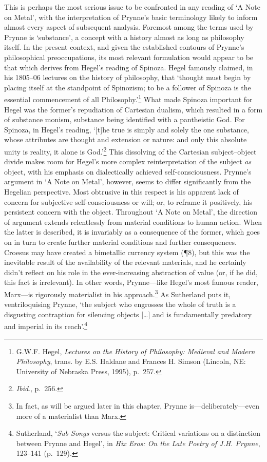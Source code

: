 \documentclass[]{article}
\begin{document}
This is perhaps the most serious issue to be confronted in any reading
of `A Note on Metal', with the interpretation of Prynne's basic
terminology likely to inform almost every aspect of subsequent analysis.
Foremost among the terms used by Prynne is `substance', a concept with a
history almost as long as philosophy itself. In the present context, and
given the established contours of Prynne's philosophical preoccupations,
its most relevant formulation would appear to be that which derives from
Hegel's reading of Spinoza. Hegel famously claimed, in his 1805--06
lectures on the history of philosophy, that `thought must begin by
placing itself at the standpoint of Spinozism; to be a follower of
Spinoza is the essential commencement of all Philosophy.'\footnote{G.W.F.
  Hegel, \emph{Lectures on the History of Philosophy: Medieval and
  Modern Philosophy}, trans. by E.S. Haldane and Frances H. Simson
  (Lincoln, NE: University of Nebraska Press, 1995), p.~257.} What made
Spinoza important for Hegel was the former's repudiation of Cartesian
dualism, which resulted in a form of substance monism, substance being
identified with a pantheistic God. For Spinoza, in Hegel's reading,
`{[}t{]}he true is simply and solely the one substance, whose attributes
are thought and extension or nature: and only this absolute unity is
reality, it alone is God.'\footnote{\emph{Ibid}., p.~256.} This
dissolving of the Cartesian subject--object divide makes room for
Hegel's more complex reinterpretation of the subject \emph{as} object,
with his emphasis on dialectically achieved self-consciousness. Prynne's
argument in `A Note on Metal', however, seems to differ significantly
from the Hegelian perspective. Most obtrusive in this respect is his
apparent lack of concern for subjective self-consciousness or will; or,
to reframe it positively, his persistent concern with the object.
Throughout `A Note on Metal', the direction of argument extends
relentlessly from material conditions to human action. When the latter
is described, it is invariably as a consequence of the former, which
goes on in turn to create further material conditions and further
consequences. Croesus may have created a bimetallic currency system
(¶8), but this was the inevitable result of the availability of the
relevant materials, and he certainly didn't reflect on his role in the
ever-increasing abstraction of value (or, if he did, this fact is
irrelevant). In other words, Prynne---like Hegel's most famous reader,
Marx---is rigorously materialist in his approach.\footnote{In fact, as
  will be argued later in this chapter, Prynne is---deliberately---even
  more of a materialist than Marx.} As Sutherland puts it,
ventriloquising Prynne, `the subject who engrosses the whole of truth is
a disgusting contraption for silencing objects {[}\ldots{}{]} and is
fundamentally predatory and imperial in its reach'.\footnote{Sutherland,
  `\emph{Sub Songs} versus the subject: Critical variations on a
  distinction between Prynne and Hegel', in \emph{Hix Eros: On the Late
  Poetry of J.H. Prynne}, 123--141 (p.~129).}
\end{document}
